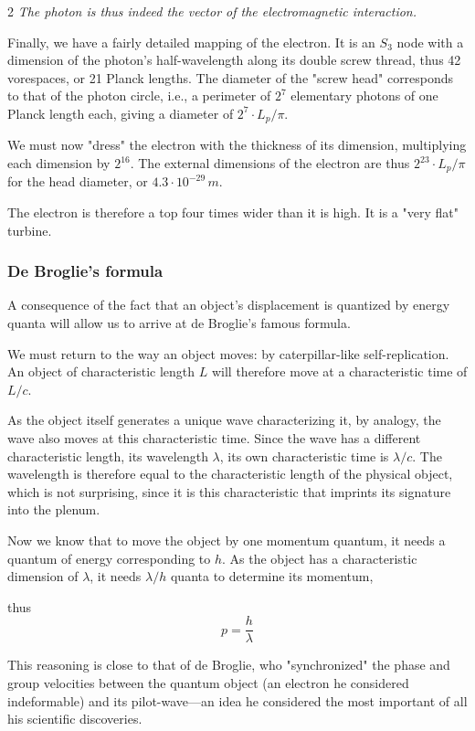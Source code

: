 \begin{multicols}{2}
	\textit{The photon is thus indeed the vector of the electromagnetic interaction.}
	
	Finally, we have a fairly detailed mapping of the electron. It is an $S_3$ node with a dimension of the photon's half-wavelength along its double screw thread, thus 42 vorespaces, or 21 Planck lengths. The diameter of the "screw head" corresponds to that of the photon circle, i.e., a perimeter of $2^7$ elementary photons of one Planck length each, giving a diameter of $2^7 \cdot L_p/\pi$.
	
	We must now "dress" the electron with the thickness of its dimension, multiplying each dimension by $2^{16}$. The external dimensions of the electron are thus $2^{23} \cdot L_p/\pi$ for the head diameter, or $4.3 \cdot 10^{-29}\,m$.
	
	The electron is therefore a top four times wider than it is high. It is a "very flat" turbine.
	
	\subsubsection{De Broglie's formula}
	
	A consequence of the fact that an object's displacement is quantized by energy quanta will allow us to arrive at de Broglie's famous formula.
	
	We must return to the way an object moves: by caterpillar-like self-replication. An object of characteristic length $L$ will therefore move at a characteristic time of $L/c$.
	
	As the object itself generates a unique wave characterizing it, by analogy, the wave also moves at this characteristic time. Since the wave has a different characteristic length, its wavelength $\lambda$, its own characteristic time is $\lambda/c$. The wavelength is therefore equal to the characteristic length of the physical object, which is not surprising, since it is this characteristic that imprints its signature into the plenum.
	
	Now we know that to move the object by one momentum quantum, it needs a quantum of energy corresponding to $h$. As the object has a characteristic dimension of $\lambda$, it needs $\lambda/h$ quanta to determine its momentum,
	
	thus
	\begin{equation*}
		p = \frac {h}{\lambda}
	\end{equation*}
	
	This reasoning is close to that of de Broglie, who "synchronized" the phase and group velocities between the quantum object (an electron he considered indeformable) and its pilot-wave—an idea he considered the most important of all his scientific discoveries.\cite{debroglie1963etude}
	

\end{multicols}
